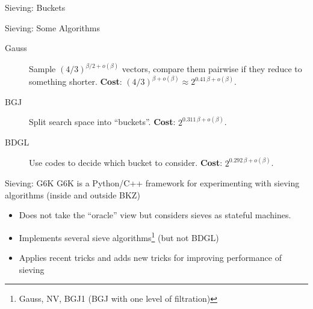 \documentclass[xcolor=table,10pt,aspectratio=169]{beamer}
\begin{document}
\begin{frame}[label={sec:orgfcfdca8}]{Sieving: Buckets}
\tikzset{external/export=true}
\centering
{}
\tikzset{external/export=false}
\end{frame}

\begin{frame}[label={sec:org47ea5ac}]{Sieving: Some Algorithms}
\begin{description}
\item[{Gauss}] Sample \((4/3)^{\beta/2 + o(\beta)}\) vectors, compare them pairwise if they reduce to something shorter. \textbf{Cost}: \((4/3)^{\beta + o(\beta)} \approx 2^{0.41\,\beta + o(\beta)}\).
\item[{BGJ}] Split search space into “buckets”. \textbf{Cost}: \(2^{0.311\,\beta + o(\beta)}\).
\item[{BDGL}] Use codes to decide which bucket to consider. \textbf{Cost}: \(2^{0.292\,\beta + o(\beta)}\). 
\end{description}
\end{frame}

\begin{frame}[label={sec:org9d3b50a}]{Sieving: G6K}
G6K  is a Python/C++ framework for experimenting with sieving algorithms (inside and outside BKZ)
\begin{itemize}
\item Does not take the “oracle” view but considers sieves as stateful machines.
\item Implements several sieve algorithms\footnote{Gauss, NV, BGJ1 (BGJ with one level of filtration)} (but not BDGL)
\item Applies recent tricks and adds new tricks for improving performance of sieving
\end{itemize}
\end{frame}
\end{document}
